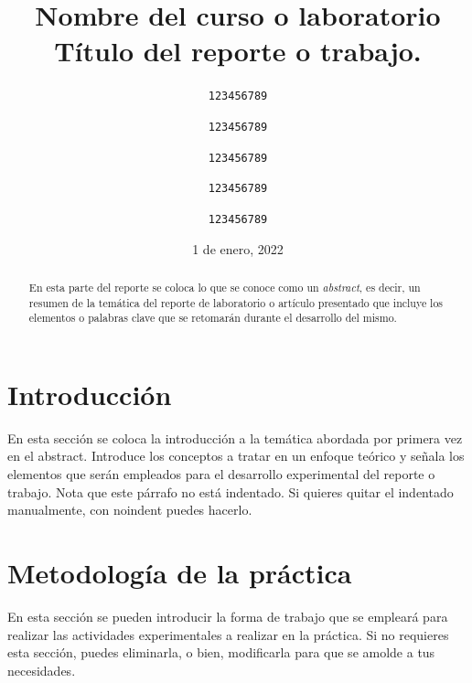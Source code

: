 \documentclass[letterpaper,12pt]{article} %
\begin{document}
    
    \tableofcontents
    \newpage

\title{Nombre del curso o laboratorio \\\textbf{Título del reporte o trabajo.} \\ } 

\author{
  \normalsize{\texttt{123456789}} \and
  \normalsize{\texttt{123456789}}
  \and
 \normalsize{\texttt{123456789}}
  \and
  \normalsize{\texttt{123456789}}
  \and
  \normalsize{\texttt{123456789}}
}
\date{1 de enero, 2022}
\maketitle
\thispagestyle{fancy}

\begin{abstract}
En esta parte del reporte se coloca lo que se conoce como un \textit{abstract}, es decir, un resumen de la temática del reporte de laboratorio o artículo presentado que incluye los elementos o palabras clave que se retomarán durante el desarrollo del mismo.
\end{abstract}


\section{Introducción}

\noindent En esta sección se coloca la introducción a la temática abordada por primera vez en el abstract. Introduce los conceptos a tratar en un enfoque teórico y señala los elementos que serán empleados para el desarrollo experimental del reporte o trabajo. Nota que este párrafo no está indentado. Si quieres quitar el indentado manualmente, con noindent puedes hacerlo.

\section{Metodología de la práctica}

En esta sección se pueden introducir la forma de trabajo que se empleará para realizar las actividades experimentales a realizar en la práctica. Si no requieres esta sección, puedes eliminarla, o bien, modificarla para que se amolde a tus necesidades.
\end{document}
